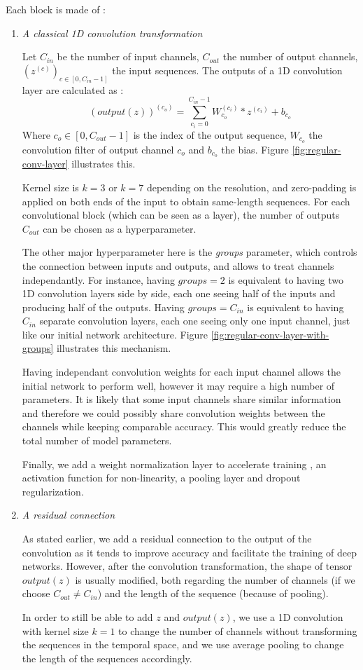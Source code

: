 \documentclass{article}
\begin{document}
Each block is made of :
\begin{enumerate}
    \item \emph{A classical 1D convolution transformation}
    \par
    Let $C_{in}$ be the number of input channels, $C_{out}$ the number of output channels, $(z^{(c)})_{c \in [0, C_{in}-1]}$ the input sequences. The outputs of a 1D convolution layer are calculated as :
    $$(output(z))^{(c_o)} = \sum_{c_i=0}^{C_{in}-1} W_{c_o}^{(c_i)} * z^{(c_i)} + b_{c_o}$$
    Where $c_o \in [0, C_{out}-1]$ is the index of the output sequence, $W_{c_o}$ the convolution filter of output channel $c_o$ and $b_{c_o}$ the bias.
    Figure \ref{fig:regular-conv-layer} illustrates this.
    \par
    Kernel size is $k=3$ or $k=7$ depending on the resolution, and zero-padding is applied on both ends of the input to obtain same-length sequences.
    For each convolutional block (which can be seen as a layer), the number of outputs $C_{out}$ can be chosen as a hyperparameter.
    \par
    The other major hyperparameter here is the \emph{groups} parameter, which controls the connection between inputs and outputs, and allows to treat channels independantly.
    For instance, having $groups=2$ is equivalent to having two 1D convolution layers side by side, each one seeing half of the inputs and producing half of the outputs. Having $groups=C_{in}$ is equivalent to having $C_{in}$ separate convolution layers, each one seeing only one input channel, just like our initial network architecture.
    Figure \ref{fig:regular-conv-layer-with-groups} illustrates this mechanism.
    \par
    Having independant convolution weights for each input channel allows the initial network to perform well, however it may require a high number of parameters. It is likely that some input channels share similar information and therefore we could possibly share convolution weights between the channels while keeping comparable accuracy. This would greatly reduce the total number of model parameters.
    \par
    Finally, we add a weight normalization layer to accelerate training \cite{salimans2016weight}, an activation function for non-linearity, a pooling layer and dropout regularization.
    
    \item \emph{A residual connection}
    \par
    As stated earlier, we add a residual connection to the output of the convolution as it tends to improve accuracy and facilitate the training of deep networks. However, after the convolution transformation, the shape of tensor $output(z)$ is usually modified, both regarding the number of channels (if we choose $C_{out} \neq C_{in}$) and the length of the sequence (because of pooling).
    \par
    In order to still be able to add $z$ and $output(z)$, we use a 1D convolution with kernel size $k=1$ to change the number of channels without transforming the sequences in the temporal space, and we use average pooling to change the length of the sequences accordingly.
    

\end{enumerate}
\end{document}
